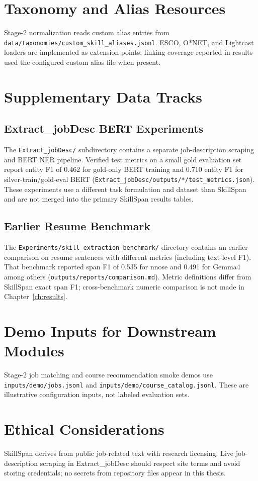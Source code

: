 \section{Taxonomy and Alias Resources}

Stage-2 normalization reads custom alias entries from \texttt{data/taxonomies/custom\_skill\_aliases.jsonl}.
ESCO, O*NET, and Lightcast loaders are implemented as extension points; linking coverage reported in results used the configured custom alias file when present.

\section{Supplementary Data Tracks}

\subsection{Extract\_jobDesc BERT Experiments}

The \texttt{Extract\_jobDesc/} subdirectory contains a separate job-description scraping and BERT NER pipeline.
Verified test metrics on a small gold evaluation set report entity F1 of 0.462 for gold-only BERT training and 0.710 entity F1 for silver-train/gold-eval BERT (\texttt{Extract\_jobDesc/outputs/*/test\_metrics.json}).
These experiments use a different task formulation and dataset than SkillSpan and are not merged into the primary SkillSpan results tables.

\subsection{Earlier Resume Benchmark}

The \texttt{Experiments/skill\_extraction\_benchmark/} directory contains an earlier comparison on resume sentences with different metrics (including text-level F1).
That benchmark reported span F1 of 0.535 for nnose and 0.491 for Gemma4 among others (\texttt{outputs/reports/comparison.md}).
Metric definitions differ from SkillSpan exact span F1; cross-benchmark numeric comparison is not made in Chapter~\ref{ch:results}.

\section{Demo Inputs for Downstream Modules}

Stage-2 job matching and course recommendation smoke demos use \texttt{inputs/demo/jobs.jsonl} and \texttt{inputs/demo/course\_catalog.jsonl}.
These are illustrative configuration inputs, not labeled evaluation sets.

\section{Ethical Considerations}

SkillSpan derives from public job-related text with research licensing.
Live job-description scraping in Extract\_jobDesc should respect site terms and avoid storing credentials; no secrets from repository files appear in this thesis.
